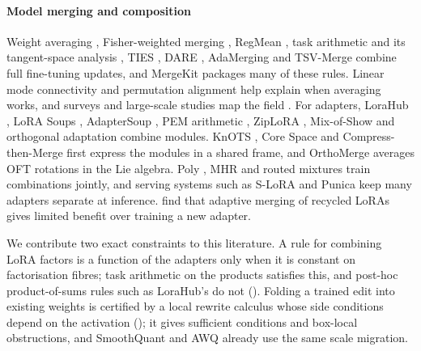 \paragraph{Model merging and composition}
Weight averaging \citep{wortsman2022model,wortsman2021robust}, Fisher-weighted merging \citep{matena2021merging}, RegMean \citep{jin2022dataless}, task arithmetic \citep{ilharco2022editing} and its tangent-space analysis \citep{ortizjimenez2023task}, TIES \citep{yadav2023ties}, DARE \citep{yu2023language}, AdaMerging \citep{yang2023adamerging} and TSV-Merge \citep{gargiulo2024task} combine full fine-tuning updates, and MergeKit \citep{xgoddard2024mergekit} packages many of these rules. Linear mode connectivity \citep{frankle2019linear} and permutation alignment \citep{ainsworth2022git,xentezari2022role} help explain when averaging works, and surveys and large-scale studies map the field \citep{yang2024model,yadav2024matters,wang2025model}. For adapters, LoraHub \citep{huang2023lorahub}, LoRA Soups \citep{prabhakar2024lora}, AdapterSoup \citep{chronopoulou2023adaptersoup}, PEM arithmetic \citep{zhang2023composing}, ZipLoRA \citep{shah2023ziplora}, Mix-of-Show \citep{gu2023mix} and orthogonal adaptation \citep{po2023orthogonal} combine modules. KnOTS \citep{stoica2024model}, Core Space \citep{panariello2025accurate} and Compress-then-Merge \citep{he2026compress} first express the modules in a shared frame, and OrthoMerge \citep{yang2026orthogonal} averages OFT rotations in the Lie algebra. Poly \citep{ponti2022combining}, MHR \citep{caccia2022multi} and routed mixtures \citep{wu2024mixture,dou2023loramoe,buehler2024x} train combinations jointly, and serving systems such as S-LoRA \citep{sheng2023s} and Punica \citep{chen2023punica} keep many adapters separate at inference. \citet{liu2026appeal} find that adaptive merging of recycled LoRAs gives limited benefit over training a new adapter.

We contribute two exact constraints to this literature. A rule for combining LoRA factors is a function of the adapters only when it is constant on factorisation fibres; task arithmetic on the products satisfies this, and post-hoc product-of-sums rules such as LoraHub's do not (). Folding a trained edit into existing weights is certified by a local rewrite calculus whose side conditions depend on the activation (); it gives sufficient conditions and box-local obstructions, and SmoothQuant and AWQ already use the same scale migration.

